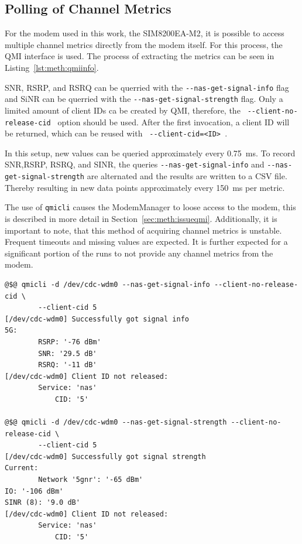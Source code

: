 \subsection{Polling of Channel Metrics}\label{sec:meth:channelmetrics}

For the modem used in this work, the SIM8200EA-M2, it is possible to access multiple channel metrics directly
from the modem itself.
For this process, the QMI interface is used.
The process of extracting the metrics can be seen in Listing~\ref{lst:meth:qmiinfo}.

\gls{SNR}, \gls{RSRP}, and \gls{RSRQ} can be querried with the \texttt{-{}-nas-get-signal-info} flag and
\gls{SiNR} can be querried with the \texttt{-{}-nas-get-signal-strength} flag.
Only a limited amount of client IDs ca be created by QMI, therefore, the \texttt{ -{}-client-no-release-cid } option should be used.
After the first invocation, a client ID will be returned, which can be reused with \texttt{ -{}-client-cid=<ID> }.

In this setup, new values can be queried approximately every \SI{0.75}{\milli\second}.
To record SNR,RSRP, RSRQ, and SINR, the queries \texttt{-{}-nas-get-signal-info} and
\newline\texttt{-{}-nas-get-signal-strength} are alternated and the results are written to a CSV file.
Thereby resulting in new data points approximately every \SI{150}{\milli\second} per metric.

The use of \texttt{qmicli} causes the ModemManager to loose access to the modem, this is described in more detail in Section~\ref{sec:meth:issueqmi}.
Additionally, it is important to note, that this method of acquiring channel metrics is unstable.
Frequent timeouts and missing values are expected.
It is further expected for a significant portion of the runs to not provide any channel metrics from the modem.


\begin{lstfloat}[htb]
\begin{lstlisting}[basicstyle={\ttfamily\small\color{black}},style=base,caption={Extracting channel metrics from a modem.},label={lst:meth:qmiinfo}]
@$@ qmicli -d /dev/cdc-wdm0 --nas-get-signal-info --client-no-release-cid \
        --client-cid 5
[/dev/cdc-wdm0] Successfully got signal info
5G:
        RSRP: '-76 dBm'
        SNR: '29.5 dB'
        RSRQ: '-11 dB'
[/dev/cdc-wdm0] Client ID not released:
        Service: 'nas'
            CID: '5'

@$@ qmicli -d /dev/cdc-wdm0 --nas-get-signal-strength --client-no-release-cid \
        --client-cid 5
[/dev/cdc-wdm0] Successfully got signal strength
Current:
        Network '5gnr': '-65 dBm'
IO: '-106 dBm'
SINR (8): '9.0 dB'
[/dev/cdc-wdm0] Client ID not released:
        Service: 'nas'
            CID: '5'
\end{lstlisting}
\end{lstfloat}



